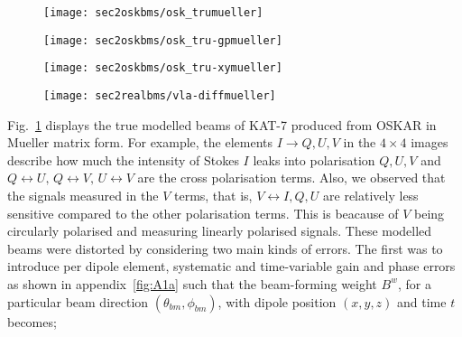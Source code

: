 \documentclass[fleqn,usenatbib]{mnras}
\begin{document}
\begin{figure*}
  \centering
  \begin{minipage}[H]{\linewidth}
     \begin{subfigure}[b]{0.495\textwidth}
      \texttt{[image: sec2oskbms/osk\_trumueller]}
                \caption{}
                \label{fig:truosk1}
        \end{subfigure}       
        \begin{subfigure}[b]{0.485\textwidth}
 \texttt{[image: sec2oskbms/osk\_tru-gpmueller]}
                \caption{}
               \label{fig:truosk2}
        \end{subfigure}
        \begin{subfigure}[b]{0.495\textwidth}
      \texttt{[image: sec2oskbms/osk\_tru-xymueller]}
                \caption{}
                \label{fig:truosk3}
        \end{subfigure}       
        \begin{subfigure}[b]{0.485\textwidth}
         \texttt{[image: sec2realbms/vla-diffmueller]}
                \caption{}
               \label{fig:truosk4}
        \end{subfigure}
         \end{minipage}
    \caption{\textit{Mueller matrix representations of full polarisation beams produced at $1$ GHz} 
    (a) \textit{$4 \times 4$ images of KAT-7 uncorrupted OSKAR beams.} 
    (b) \textit{Difference between the uncorrupted OSKAR beams in Fig.~\ref{fig:truosk1} and the gain and phase error beams in appendix~\ref{fig:A1a} }
     (c) \textit{Difference between uncorrupted OSKAR beams in Fig.~\ref{fig:truosk1} and the dipole orientation error beams in  appendix~\ref{fig:A1b}.}
     (d) \textit{Difference between VLA holography measured beams in   appendices~\ref{fig:A2a} and~\ref{fig:A2b}.}
      }
	    \label{fig:truosk}
  \end{figure*}  

Fig.~\ref{fig:truosk1} displays the true modelled beams of KAT-7 produced from OSKAR in Mueller matrix form. For example, the elements $I \rightarrow Q, U, V$ in the $4 \times 4$ images describe how much the intensity of Stokes $I$ leaks into polarisation $Q, U, V$ and $Q \leftrightarrow U, \, Q \leftrightarrow  V, \, U \leftrightarrow  V$ are the cross polarisation terms. Also, we observed that the signals measured in the $V$ terms, that is, $V \leftrightarrow I, Q, U$ are relatively less sensitive compared to the other polarisation terms. This is beacause of $V$ being circularly polarised and measuring linearly polarised signals. These modelled beams were distorted by considering two main kinds of errors. The first was to introduce per dipole element, systematic and time-variable gain and phase errors as shown in appendix~\ref{fig:A1a} such that the beam-forming weight $B^{w}$, for a particular beam direction $(\theta_{bm}, \phi_{bm})$, with dipole position $(x, y, z)$ and time $t$ becomes;
\end{document}
